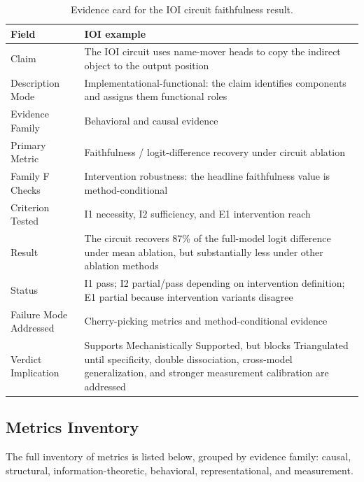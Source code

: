 \documentclass[10pt]{article}
\begin{document}
\begin{table}[H]
\centering
\small
\caption{Evidence card for the IOI circuit faithfulness result.}
\renewcommand{\arraystretch}{1.2}
\begin{tabular}{@{}lp{10cm}@{}}
\toprule
\textbf{Field} & \textbf{IOI example} \\
\midrule
Claim & The IOI circuit uses name-mover heads to copy the indirect object to the output position \\
\midrule
Description Mode & Implementational-functional: the claim identifies components and assigns them functional roles \\
\midrule
Evidence Family & Behavioral and causal evidence \\
\midrule
Primary Metric & Faithfulness / logit-difference recovery under circuit ablation \\
\midrule
Family F Checks & Intervention robustness: the headline faithfulness value is method-conditional \\
\midrule
Criterion Tested & I1 necessity, I2 sufficiency, and E1 intervention reach \\
\midrule
Result & The circuit recovers 87\% of the full-model logit difference under mean ablation, but substantially less under other ablation methods \\
\midrule
Status & I1 pass; I2 partial/pass depending on intervention definition; E1 partial because intervention variants disagree \\
\midrule
Failure Mode Addressed & Cherry-picking metrics and method-conditional evidence \\
\midrule
Verdict Implication & Supports Mechanistically Supported, but blocks Triangulated until specificity, double dissociation, cross-model generalization, and stronger measurement calibration are addressed \\
\bottomrule
\end{tabular}
\label{tabevidencecardioi}
\end{table}




\subsection{Metrics Inventory}
\label{appendix:metrics}
The full inventory of metrics is listed below, grouped by evidence family: causal,
structural, information-theoretic, behavioral, representational, and measurement. \\
\\
\begingroup
\small
\setlength{\tabcolsep}{4pt}
\renewcommand{\arraystretch}{1.15}
\end{document}
